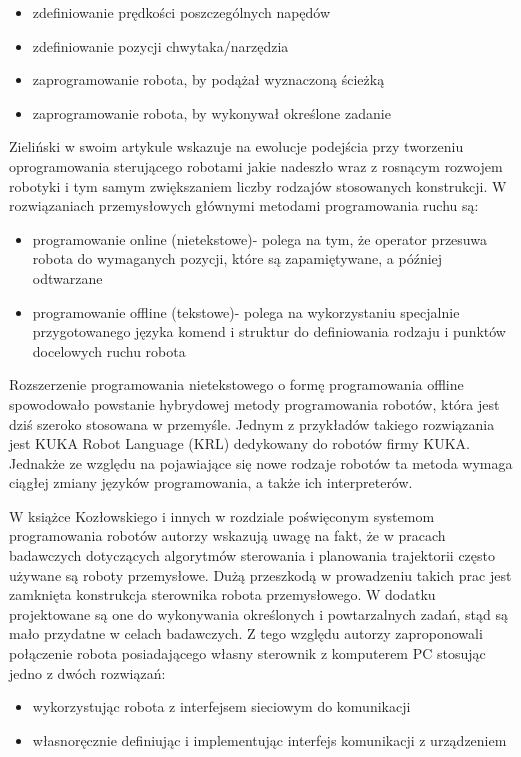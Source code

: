 \documentclass[a4paper, 12pt, twoside]{article}
\begin{document}
\begin{itemize}
\item zdefiniowanie prędkości poszczególnych napędów
\item zdefiniowanie pozycji chwytaka/narzędzia
\item zaprogramowanie robota, by podążał wyznaczoną ścieżką
\item zaprogramowanie robota, by wykonywał określone zadanie
\end{itemize}

Zieliński w swoim artykule \cite{ramowezielinski} wskazuje na ewolucje podejścia przy tworzeniu oprogramowania sterującego robotami jakie nadeszło wraz z rosnącym rozwojem robotyki i tym samym zwiększaniem liczby rodzajów stosowanych konstrukcji. W rozwiązaniach przemysłowych głównymi metodami programowania ruchu są:

\begin{itemize}
\item programowanie online (nietekstowe)- polega na tym, że operator przesuwa robota do wymaganych pozycji, które są zapamiętywane, a później odtwarzane
\item programowanie offline (tekstowe)- polega na wykorzystaniu specjalnie przygotowanego języka komend i struktur do definiowania rodzaju i punktów docelowych ruchu robota
\end{itemize}

Rozszerzenie programowania nietekstowego o formę programowania offline spowodowało powstanie hybrydowej metody programowania robotów, która jest dziś szeroko stosowana w przemyśle. Jednym z przykładów takiego rozwiązania jest KUKA Robot Language (KRL)  dedykowany do robotów firmy KUKA. Jednakże ze względu na pojawiające się nowe rodzaje robotów ta metoda wymaga ciągłej zmiany języków programowania, a także ich interpreterów.

W książce Kozłowskiego i innych \cite{systemkozlowski} w rozdziale poświęconym systemom programowania robotów autorzy wskazują uwagę na fakt, że w pracach badawczych dotyczących algorytmów sterowania i planowania trajektorii często używane są roboty przemysłowe. Dużą przeszkodą w prowadzeniu takich prac jest zamknięta konstrukcja sterownika robota przemysłowego. W dodatku projektowane są one do wykonywania określonych i powtarzalnych zadań, stąd są mało przydatne w celach badawczych. Z tego względu autorzy zaproponowali połączenie robota posiadającego własny sterownik z komputerem PC stosując jedno z dwóch rozwiązań:

\begin{itemize}
\item wykorzystując robota z interfejsem sieciowym do komunikacji
\item własnoręcznie definiując i implementując interfejs komunikacji z urządzeniem
\end{itemize} 
\end{document}
